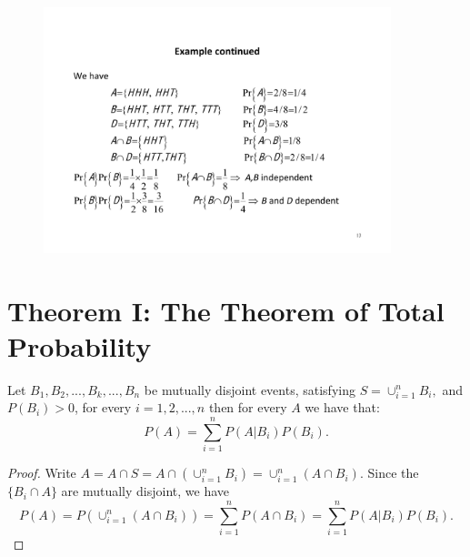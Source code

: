 \documentclass[notes=show, handout]{beamer}\usepackage[]{graphicx}\usepackage[]{color}
\begin{document}
\begin{frame}{\secname}
  \begin{example}[cont'd]
  \begin{figure}[h!]
  \centering
  \includegraphics[width=0.9\textwidth,height=0.6\textheight]{img/example8.pdf}
  \end{figure}
  \end{example}
\end{frame}


\section{Theorem I: The Theorem of Total Probability}

\begin{frame}{\secname}
  \begin{theorem}
  \label{Th:totprob}
  Let  $B_1,B_2,...,B_k,...,B_n$ be mutually disjoint events, satisfying
  $S=\cup_{i=1}^{n} B_i,$ and $P(B_i)>0$, for every $i=1,2,...,n$ then for every $A$ we have that:
  \begin{equation}
  \label{TP}
  P(A)=\sum_{i=1}^n P(A\vert B_i) P(B_i).
  \end{equation}
  \end{theorem}
\pause
  \begin{footnotesize}
  \begin{proof}
  Write $A=A\cap S = A\cap (\cup_{i=1}^{n} B_i) = \cup_{i=1}^{n} (A\cap B_i)$. Since the $\{B_i \cap A \}$ are mutually disjoint, we have
  \begin{equation*}
  P(A)=P\left(  \cup_{i=1}^{n} (A\cap B_i)  \right)=\sum_{i=1}^n P\left( A\cap B_i  \right ) =\sum_{i=1}^n P(A\vert B_i) P(B_i).
  \end{equation*}
  \end{proof}
  \end{footnotesize}
\end{frame}
\end{document}
